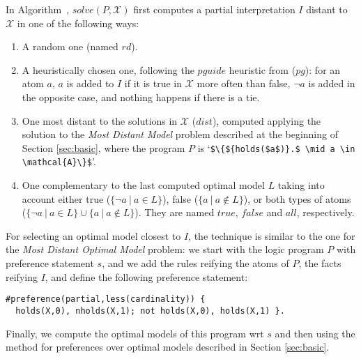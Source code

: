 In Algorithm~, $\mathit{solve}(P,\mathcal{X})$ first computes a partial interpretation $I$ 
distant to $\mathcal{X}$ in one of the following ways:
\begin{enumerate}
\item 
A random one (named $\mathit{rd}$).
\item 
A heuristically chosen one, following the $\mathit{pguide}$ heuristic from \cite{nadel11a} ($pg$):
for an atom $a$, $a$ is added to $I$ if it is true in $\mathcal{X}$ more often than false, 
$\neg a$ is added in the opposite case, and nothing happens if there is a tie.
\item 
One most distant to the solutions in $\mathcal{X}$ ($\mathit{dist}$), 
computed applying the solution to the \emph{Most Distant Model} problem described at the beginning of Section \ref{sec:basic}, %
where the program $P$ is `\lstinline[mathescape=true]!$\{${holds($a$)}.$ \mid a \in \mathcal{A}\}$!'.
\item 
One complementary to the last computed optimal model $L$ 
taking into account either 
true ($\{ \neg a \ | \ a \in L\}$), 
false ($\{ a \ | \ a \notin L\}$), 
or both types of atoms ($\{ \neg a \ | \ a \in L\} \cup \{ a \ | \ a \notin L\}$). 
They are named $\mathit{true}$, $\mathit{false}$ and $\mathit{all}$, respectively.
\end{enumerate}
%
For selecting an optimal model closest to $I$, 
the technique is similar to the one for the \emph{Most Distant Optimal Model} problem:
we start with the logic program $P$ with preference statement $s$, 
and we add the rules 
 reifying the atoms of $P$, 
the facts 
 reifying $I$,  
and define the following preference statement: 
\begin{lstlisting}
#preference(partial,less(cardinality)) {
  holds(X,0), nholds(X,1); not holds(X,0), holds(X,1) }.
\end{lstlisting}
Finally, we compute the optimal models of this program wrt $s$ and then 
using the method for preferences over optimal models described in Section \ref{sec:basic}. %

